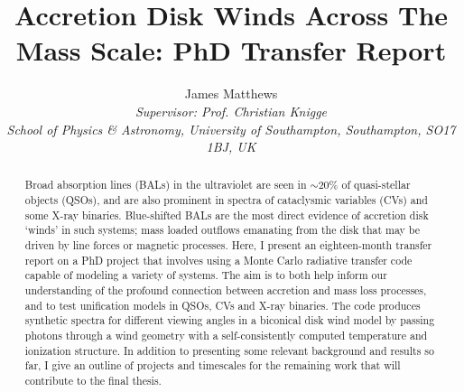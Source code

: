 \documentclass[useAMS,usenatbib,onecolumn]{mn2e2}
\begin{document}

\def\la{Ly-$\alpha$ }
\def\py{\textsc{Python} }
\def\tar{\textsc{Tardis} }
\def\cld{\textsc{Cloudy} }
\def\civ{C~\textsc{iv} }
\def\araa{ARAA}
\def\nat{Nature}
\def\apjl{ApJ Letters}
\def\aapr{AAPR}
\def\ssr{SSR}
\def\apj{ApJ}
\def\pasp{PASP}
\def\aap{A\&A}
\def\mnras{MNRAS}
\def\aj{AJ}
\def\rmxaa{RMXAA}

%
%

\title{Accretion Disk Winds Across The Mass Scale: PhD Transfer Report}


\author[Matthews, J.]{James Matthews \\
{\sl  Supervisor: Prof. Christian Knigge} \\
{\sl School of Physics \& Astronomy, University of Southampton,
  Southampton, SO17 1BJ, UK}}


%
%

\maketitle


\begin{abstract} 
Broad absorption lines (BALs) in the ultraviolet 
are seen in $\sim20\%$ of quasi-stellar objects (QSOs), and 
are also prominent in spectra of cataclysmic variables (CVs)
and some X-ray binaries. Blue-shifted BALs are the most direct evidence of 
accretion disk `winds' in such systems; mass loaded outflows
emanating from the disk that may be driven by line forces or
magnetic processes. Here, I present an eighteen-month transfer report
on a PhD project that involves using a Monte Carlo radiative transfer code
capable of modeling a variety of systems. The aim is to both
help inform our understanding of the profound connection between 
accretion and mass loss processes, and to test unification models in 
QSOs, CVs and X-ray binaries. 
The code produces synthetic spectra for different viewing angles in
a biconical disk wind model by passing photons through a wind geometry
with a self-consistently computed temperature and ionization structure.
In addition to presenting some relevant background and results so far,
I give an outline of projects and timescales for the remaining work
that will contribute to the final thesis.
\end{abstract}
\end{document}
